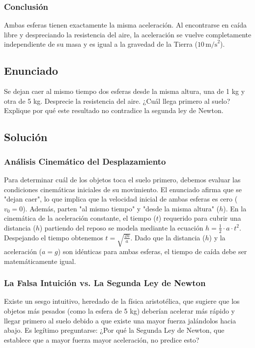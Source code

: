 \documentclass[12pt]{article}
\begin{document}
\subsubsection*{Conclusión}
Ambas esferas tienen exactamente la misma aceleración. Al encontrarse en caída libre y despreciando la resistencia del aire, la aceleración se vuelve completamente independiente de su masa y es igual a la gravedad de la Tierra ($10 \, \text{m/s}^2$).

\newpage

\subsection*{Enunciado}
Se dejan caer al mismo tiempo dos esferas desde la misma altura, una de 1 kg y otra de 5 kg. Desprecie la resistencia del aire. ¿Cuál llega primero al suelo? Explique por qué este resultado no contradice la segunda ley de Newton.

\subsection*{Solución}

\subsubsection*{Análisis Cinemático del Desplazamiento}
Para determinar cuál de los objetos toca el suelo primero, debemos evaluar las condiciones cinemáticas iniciales de su movimiento. El enunciado afirma que se "dejan caer", lo que implica que la velocidad inicial de ambas esferas es cero ($v_0 = 0$). Además, parten "al mismo tiempo" y "desde la misma altura" ($h$). 
En la cinemática de la aceleración constante, el tiempo ($t$) requerido para cubrir una distancia ($h$) partiendo del reposo se modela mediante la ecuación $h = \frac{1}{2} \cdot a \cdot t^2$. Despejando el tiempo obtenemos $t = \sqrt{\frac{2h}{a}}$. Dado que la distancia ($h$) y la aceleración ($a = g$) son idénticas para ambas esferas, el tiempo de caída debe ser matemáticamente igual.

\subsubsection*{La Falsa Intuición vs. La Segunda Ley de Newton}
Existe un sesgo intuitivo, heredado de la física aristotélica, que sugiere que los objetos más pesados (como la esfera de 5 kg) deberían acelerar más rápido y llegar primero al suelo debido a que existe una mayor fuerza jalándolos hacia abajo. Es legítimo preguntarse: ¿Por qué la Segunda Ley de Newton, que establece que a mayor fuerza mayor aceleración, no predice esto?
\end{document}

